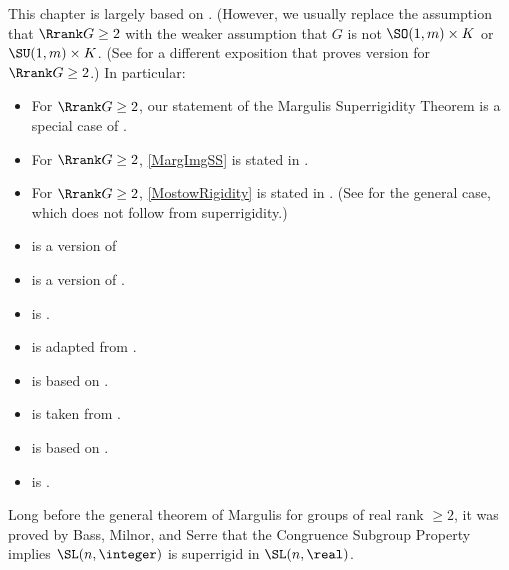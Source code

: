 \begin{notes}

This chapter is largely based on \cite[Chaps.~6 and~7]{MargulisBook}. (However, we usually replace the assumption that $\Rrank G \ge 2$ with the weaker assumption that $G$ is not $\SO(1,m) \times K$ or $\SU(1,m) \times K$. (See \cite[Thm.~5.1.2, p.~86]{ZimmerBook} for a different exposition that proves version  for $\Rrank G \ge 2$.)
In particular:
\begin{itemize}
\item For $\Rrank G \ge 2$, our statement of the Margulis Superrigidity Theorem  is a special case of \cite[Thm.~7.5.6, p.~228]{MargulisBook}.

\item For $\Rrank G \ge 2$, \cref{MargImgSS} is stated in \cite[Thm.~9.6.15(i)(a), p.~332]{MargulisBook}.

\item For $\Rrank G \ge 2$, \cref{MostowRigidity} is stated in \cite[Thm.~7.7.5, p.~254]{MargulisBook}. (See \cite[Thm.~B]{PrasadMostowRig} for the general case, which does not follow from superrigidity.)

\item {} is a version of \cite[Prop.~4.6, p.~222]{MargulisBook}
\item {} is a version of \cite[Lem.~7.5.5, p.~227]{MargulisBook}.
\item {} is \cite[Prop.~7.3.6, p.~219]{MargulisBook}.

\item {} is adapted from \cite[Thm.~6.4.3(b)2, p.~209]{MargulisBook}.

\item {} is based on \cite[Prop.~6.2.13, pp.~202--203]{MargulisBook}.
\item {} is taken from \cite[Prop.~6.4.2, p.~209]{MargulisBook}.
\item {} is based on \cite[Prop.~6.2.9, p.~200]{MargulisBook}.
\item {} is \cite[Lem.~6.3.2, p.~203]{MargulisBook}.
\end{itemize}

Long before the general theorem of Margulis for groups of real rank $\ge 2$, it was proved by Bass, Milnor, and Serre \cite[Thm.~61.2]{BassMilnorSerre-CSP} that the Congruence Subgroup Property implies $\SL(n,\integer)$ is superrigid in $\SL(n,\real)$. 


\end{notes}
